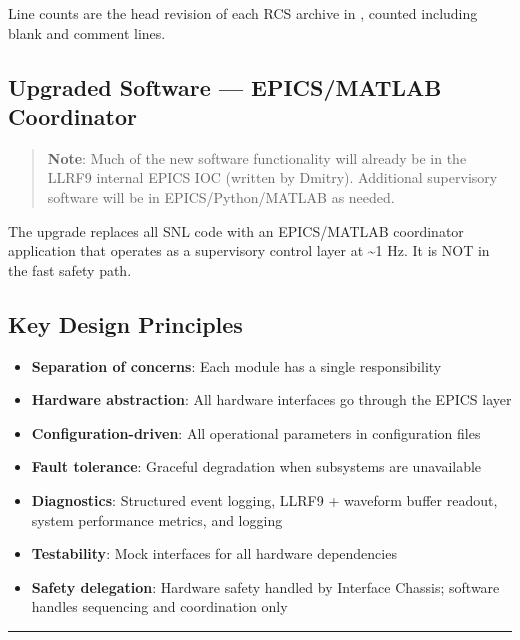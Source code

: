 Line counts are the head revision of each RCS archive in , counted including blank and comment lines.

\subsection{Upgraded Software --- EPICS/MATLAB Coordinator}\label{upgraded-software-epicsmatlab-coordinator}

\begin{quote}
\textbf{Note}: Much of the new software functionality will already be in the LLRF9 internal EPICS IOC (written by Dmitry). Additional supervisory software will be in EPICS/Python/MATLAB as needed.
\end{quote}

The upgrade replaces all SNL code with an EPICS/MATLAB coordinator application that operates as a supervisory control layer at \textasciitilde1 Hz. It is NOT in the fast safety path.

\subsection{Key Design Principles}\label{key-design-principles}

\begin{itemize}
\tightlist
\item
  \textbf{Separation of concerns}: Each module has a single responsibility
\item
  \textbf{Hardware abstraction}: All hardware interfaces go through the EPICS layer
\item
  \textbf{Configuration-driven}: All operational parameters in configuration files
\item
  \textbf{Fault tolerance}: Graceful degradation when subsystems are unavailable
\item
  \textbf{Diagnostics}: Structured event logging, LLRF9 + waveform buffer readout, system performance metrics, and logging
\item
  \textbf{Testability}: Mock interfaces for all hardware dependencies
\item
  \textbf{Safety delegation}: Hardware safety handled by Interface Chassis; software handles sequencing and coordination only
\end{itemize}

\begin{center}\rule{0.5\linewidth}{0.5pt}\end{center}

